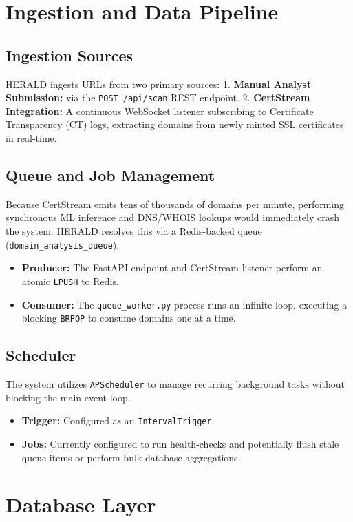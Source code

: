 \documentclass[12pt,a4paper]{report}
\begin{document}
\chapter{Ingestion and Data Pipeline}
\section{Ingestion Sources}
HERALD ingests URLs from two primary sources:
1. \textbf{Manual Analyst Submission:} via the \texttt{POST /api/scan} REST endpoint.
2. \textbf{CertStream Integration:} A continuous WebSocket listener subscribing to Certificate Transparency (CT) logs, extracting domains from newly minted SSL certificates in real-time.

\section{Queue and Job Management}
Because CertStream emits tens of thousands of domains per minute, performing synchronous ML inference and DNS/WHOIS lookups would immediately crash the system. 
HERALD resolves this via a Redis-backed queue (\texttt{domain\_analysis\_queue}).
\begin{itemize}
\item \textbf{Producer:} The FastAPI endpoint and CertStream listener perform an atomic \texttt{LPUSH} to Redis.
\item \textbf{Consumer:} The \texttt{queue\_worker.py} process runs an infinite loop, executing a blocking \texttt{BRPOP} to consume domains one at a time.
\end{itemize}

\section{Scheduler}
The system utilizes \texttt{APScheduler} to manage recurring background tasks without blocking the main event loop.
\begin{itemize}
\item \textbf{Trigger:} Configured as an \texttt{IntervalTrigger}.
\item \textbf{Jobs:} Currently configured to run health-checks and potentially flush stale queue items or perform bulk database aggregations.
\end{itemize}

\chapter{Database Layer}
\end{document}
